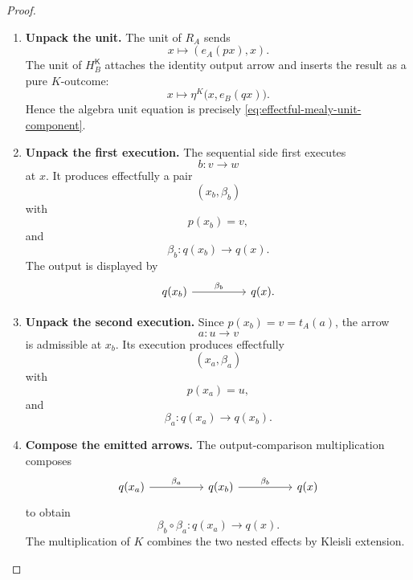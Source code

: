 \begin{proof}
    \leavevmode
    \begin{enumerate}
        \item \textbf{Unpack the unit.}
        The unit of \(R_A\) sends
        \[
            x
            \longmapsto
            (e_A(px),x).
        \]
        The unit of \(H_B^{\mathsf K}\) attaches the identity output arrow and
        inserts the result as a pure \(K\)-outcome:
        \[
            x
            \longmapsto
            \eta^K
            \bigl(x,e_B(qx)\bigr).
        \]
        Hence the algebra unit equation is precisely
        \eqref{eq:effectful-mealy-unit-component}.

        \item \textbf{Unpack the first execution.}
        The sequential side first executes
        \[
            b:v\to w
        \]
        at \(x\). It produces effectfully a pair
        \[
            (x_b,\beta_b)
        \]
        with
        \[
            p(x_b)=v,
        \]
        and
        \[
            \beta_b:
            q(x_b)\to q(x).
        \]
        The output is displayed by
        \[
            \begin{tikzcd}[column sep=huge]
                    q(x_b)
                        \arrow[r, "\beta_b"]
                &
                    q(x).
            \end{tikzcd}
        \]

        \item \textbf{Unpack the second execution.}
        Since \(p(x_b)=v=t_A(a)\), the arrow
        \[
            a:u\to v
        \]
        is admissible at \(x_b\). Its execution produces effectfully
        \[
            (x_a,\beta_a)
        \]
        with
        \[
            p(x_a)=u,
        \]
        and
        \[
            \beta_a:
            q(x_a)\to q(x_b).
        \]

        \item \textbf{Compose the emitted arrows.}
        The output-comparison multiplication composes
        \[
            \begin{tikzcd}[column sep=huge]
                    q(x_a)
                        \arrow[r, "\beta_a"]
                &
                    q(x_b)
                        \arrow[r, "\beta_b"]
                &
                    q(x)
            \end{tikzcd}
        \]
        to obtain
        \[
            \beta_b\circ\beta_a:
            q(x_a)\to q(x).
        \]
        The multiplication of \(K\) combines the two nested effects by
        Kleisli extension.


\end{enumerate}
\end{proof}
